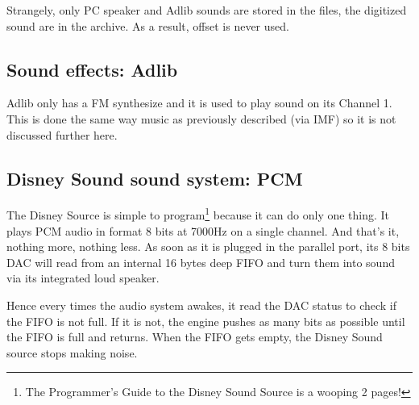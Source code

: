 \par
\begin{minipage}{\textwidth}

\end{minipage}
\par
Strangely, only PC speaker and Adlib sounds are stored in the  files, the digitized sound are in the  archive. As a result, offset  is never used.\\
\par



\subsection{Sound effects: Adlib}
Adlib only has a FM synthesize and it is used to play sound on its Channel 1. This is done the same way music as previously described (via IMF) so it is not discussed further here.












\subsection{Disney Sound sound system: PCM}
The Disney Source is simple to program\footnote{The Programmer's Guide to the Disney Sound Source is a wooping 2 pages!} because it can do only one thing. It plays PCM audio in format 8 bits at 7000Hz on a single channel. And that's it, nothing more, nothing less. As soon as it is plugged in the parallel port, its 8 bits DAC will read from an internal 16 bytes deep FIFO and turn them into sound via its integrated loud speaker.\\ 
\par
Hence every times the audio system awakes, it read the DAC status to check if the FIFO is not full. If it is not, the engine pushes as many bits as possible until the FIFO is full and returns. When the FIFO gets empty, the Disney Sound source stops making noise.\\
\par











